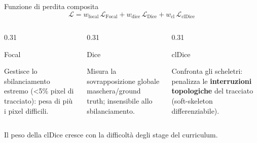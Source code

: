 \documentclass[aspectratio=169,11pt]{beamer}
\begin{document}
\begin{frame}{Funzione di perdita composita}
  \[
    \mathcal{L} = w_{\text{focal}}\,\mathcal{L}_{\text{Focal}}
                + w_{\text{dice}}\,\mathcal{L}_{\text{Dice}}
                + w_{\text{cl}}\,\mathcal{L}_{\text{clDice}}
  \]
  \vspace{1mm}
  \begin{columns}[T,onlytextwidth]
    \begin{column}{0.31\textwidth}
      \begin{block}{Focal}
        \begin{minipage}[t][2.2cm]{\linewidth}
          \footnotesize Gestisce lo \alert{sbilanciamento estremo} (<5\% pixel di tracciato): pesa di più i pixel difficili.
        \end{minipage}
      \end{block}
    \end{column}
    \hfill
    \begin{column}{0.31\textwidth}
      \begin{block}{Dice}
        \begin{minipage}[t][2.2cm]{\linewidth}
          \footnotesize Misura la \alert{sovrapposizione globale} maschera/ground truth; insensibile allo sbilanciamento.
        \end{minipage}
      \end{block}
    \end{column}
    \hfill
    \begin{column}{0.31\textwidth}
      \begin{block}{clDice}
        \begin{minipage}[t][2.2cm]{\linewidth}
          \footnotesize Confronta gli \alert{scheletri}: penalizza le \textbf{interruzioni topologiche} del tracciato (soft-skeleton differenziabile).
        \end{minipage}
      \end{block}
    \end{column}
  \end{columns}
  \vspace{2mm}
  \begin{center}
    \footnotesize Il peso della clDice \alert{cresce} con la difficoltà degli stage del curriculum.
  \end{center}
\end{frame}
\end{document}
